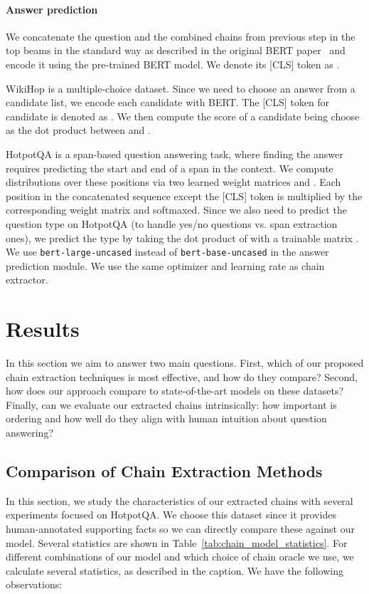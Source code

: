 \documentclass[11pt,a4paper]{article}
\begin{document}
\paragraph{Answer prediction} We concatenate the question and the combined chains from previous step in the top  beams in the standard way as described in the original BERT paper~\cite{devlin2018bert} and encode it using the pre-trained BERT model. We denote its [CLS] token as .

WikiHop is a multiple-choice dataset. Since we need to choose an answer from a candidate list, we encode each candidate with BERT. The [CLS] token for candidate  is denoted as . We then compute the score of a candidate  being choose as the dot product between  and .

HotpotQA is a span-based question answering task, where finding the answer requires predicting the start and end of a span in the context. We compute distributions over these positions via two learned weight matrices  and . Each position in the concatenated sequence except the [CLS] token is multiplied by the corresponding weight matrix and softmaxed. Since we also need to predict the question type on HotpotQA (to handle yes/no questions vs. span extraction ones), we predict the type by taking the dot product of  with a trainable matrix . We use \texttt{bert-large-uncased} instead of \texttt{bert-base-uncased} in the answer prediction module. We use the same optimizer and learning rate as chain extractor.

\section{Results}

In this section we aim to answer two main questions. First, which of our proposed chain extraction techniques is most effective, and how do they compare? Second, how does our approach compare to state-of-the-art models on these datasets? Finally, can we evaluate our extracted chains intrinsically: how important is ordering and how well do they align with human intuition about question answering?


\subsection{Comparison of Chain Extraction Methods}

In this section, we study the characteristics of our extracted chains with several experiments focused on HotpotQA. We choose this dataset since it provides human-annotated supporting facts so we can directly compare these against our model. Several statistics are shown in Table~\ref{tab:chain_model_statistics}. For different combinations of our model and which choice of chain oracle we use, we calculate several statistics, as described in the caption. We have the following observations:
\end{document}
